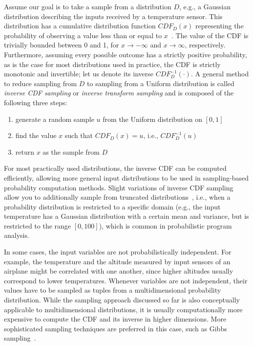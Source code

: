 Assume our goal is to take a sample from a distribution $D$, e.g., a Gaussian distribution describing the inputs received by a temperature sensor. This distribution has a cumulative distribution function $CDF_D(x)$ representing the probability of observing a value less than or equal to $x$~\cite{pestman1998mathematical}. The value of the CDF is trivially bounded between 0 and 1, for $x\to -\infty$ and $x \to \infty$, respectively. Furthermore, assuming every possible outcome has a strictly positive probability, as is the case for most distributions used in practice, the CDF is strictly monotonic and invertible; let us denote its inverse $CDF_D^{-1}(\cdot)$. A general method to reduce sampling from $D$ to sampling from a Uniform distribution is called \emph{inverse CDF sampling} or \emph{inverse transform sampling} and is composed of the following three steps:

\begin{enumerate}
	\item generate a random sample $u$ from the Uniform distribution on $[0,1]$
	\item find the value $x$ such that $CDF_D(x)=u$, i.e., $CDF_D^{-1}(u)$
	\item return $x$ as the sample from $D$
\end{enumerate}

For most practically used distributions, the inverse CDF can be computed efficiently, allowing more general input distributions to be used in sampling-based probability computation methods. Slight variations of inverse CDF sampling allow you to additionally sample from truncated distributions~\cite{cohen1991truncated}, i.e., when a probability distribution is restricted to a specific domain (e.g., the input temperature has a Gaussian distribution with a certain mean and variance, but is restricted to the range $[0,100]$), which is common in probabilistic program analysis. 

In some cases, the input variables are not probabilistically independent. For example, the temperature and the altitude measured by input sensors of an airplane might be correlated with one another, since higher altitudes usually correspond to lower temperatures. Whenever variables are not independent, their values have to be sampled as tuples from a multidimensional probability distribution. While the sampling approach discussed so far is also conceptually applicable to multidimensional distributions, it is usually computationally more expensive to compute the CDF and its inverse in higher dimensions. More sophisticated sampling techniques are preferred in this case, such as Gibbs sampling~\cite{Robert2005MCBook}.

